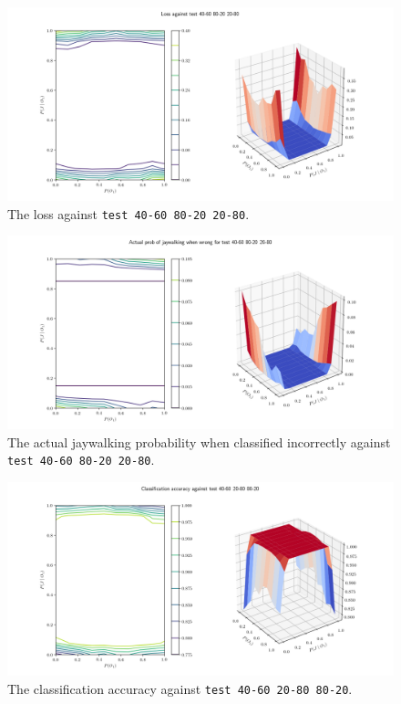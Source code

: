 \documentclass[]{report}
\newcommand{\code}{\texttt}
\begin{document}
\begin{figure}[h]
    \centering
    \centerline{\includegraphics[scale=0.55]{test_40-60_80-20_20-80_loss.png}}
    \caption[]{The loss against \code{test 40-60 80-20 20-80}.}
    \label{fig:test_40-60_80-20_20-80_loss_plot}
\end{figure}

\begin{figure}[h]
    \centering
    \centerline{\includegraphics[scale=0.55]{test_40-60_80-20_20-80_jay_prob.png}}
    \caption[]{The actual jaywalking probability when classified incorrectly against \code{test 40-60 80-20 20-80}.}
    \label{fig:test_40-60_80-20_20-80_jay_prob_plot}
\end{figure}

% 
% 

\begin{figure}[h]
    \centering
    \centerline{\includegraphics[scale=0.55]{test_40-60_20-80_80-20_accuracy.png}}
    \caption[]{The classification accuracy against \code{test 40-60 20-80 80-20}.}
    \label{fig:test_40-60_20-80_80-20_accuracy_plot}
\end{figure}
\end{document}
